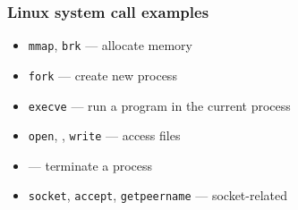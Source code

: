 \begin{frame}
\frametitle{Linux system call examples}
\begin{itemize}
\item {\tt mmap}, {\tt brk} --- allocate memory
\item {\tt fork} --- create new process
\item {\tt execve} --- run a program in the current process
\item {\tt open}, {\tt {}}, {\tt write} --- access files
\item {\tt {}} --- terminate a process
\item {\tt socket}, {\tt accept}, {\tt getpeername} --- socket-related
\end{itemize}
\end{frame}

